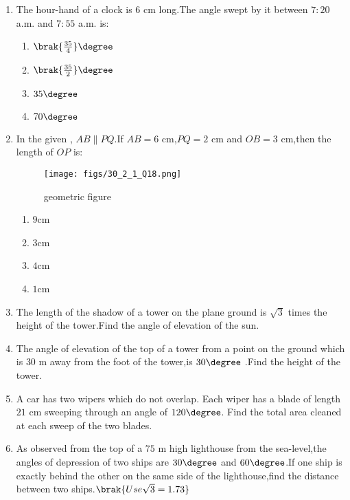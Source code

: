 \begin{enumerate}
    \item The hour-hand of a clock is $6$ cm long.The angle swept by it between $7:20$ a.m. and $7:55$ a.m. is:

\begin{enumerate}[label=(\alph*)]
    \item $\brak{\frac{35}{4}}\degree$
    \item $\brak{\frac{35}{2}}\degree$
    \item $35\degree$
    \item $70\degree$
\end{enumerate}

\item In the given , $ AB \parallel PQ $.If $AB=6$ cm,$PQ=2$ cm and $OB=3$ cm,then the length of $OP$ is:
    
    \begin{figure}[!ht]
        \centering
        \texttt{[image: figs/30\_2\_1\_Q18.png]}
        \caption{geometric figure}
        \label{fig:30_2_1_Q18}
    \end{figure}
    
\begin{enumerate}[label=(\alph*)]
    \item $9$cm
    \item $3$cm
    \item $4$cm 
    \item $1$cm
\end{enumerate}

\item The length of the shadow of a tower on the plane ground is $\sqrt{3}$ times the height of the tower.Find the angle of elevation of the sun.

\item  The angle of elevation of the top of a tower from a point on the ground which is $30$ m away from the foot of the tower,is $30\degree$ .Find the height of the tower.

\item  A car has two wipers which do not overlap. Each wiper has a blade of length $21$ cm sweeping through an angle of $120\degree$. Find the total area cleaned at each sweep of the two blades.

\item  As observed from the top of a $75$ m high lighthouse from the sea-level,the angles of depression of two ships are $30\degree$ and $60\degree$.If one ship is exactly behind the other on the same side of the lighthouse,find the distance between two ships.$\brak{Use \sqrt{3} = 1.73}$


\end{enumerate}
